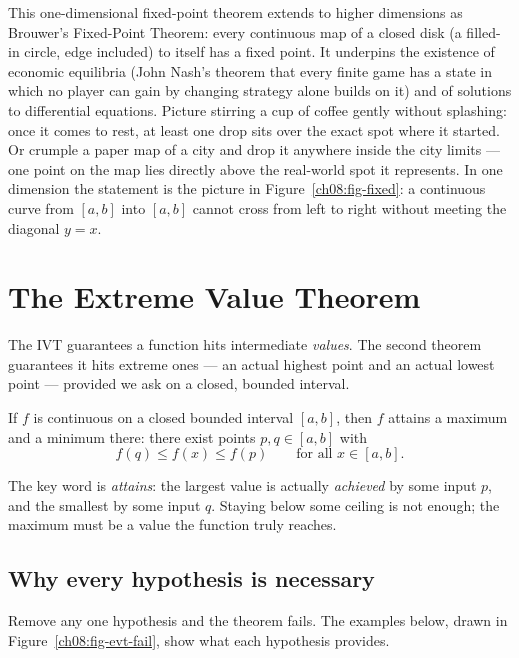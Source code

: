 \begin{connectionbox}
This one-dimensional fixed-point theorem extends to higher dimensions as
Brouwer's Fixed-Point Theorem: every continuous map of a closed disk (a filled-in circle,
edge included) to itself has a fixed point. It underpins the existence of economic
equilibria (John Nash's theorem that every finite game has a state in which no player can
gain by changing strategy alone builds on it) and of solutions to differential equations.
Picture stirring a cup of coffee gently without splashing: once it comes to rest, at least one
drop sits over the exact spot where it started. Or crumple a paper map of a city and drop it
anywhere inside the city limits --- one point on the map lies directly above the real-world spot it represents. In one dimension
the statement is the picture in Figure~\ref{ch08:fig-fixed}: a continuous curve from $[a,b]$ into $[a,b]$ cannot cross from left to right without meeting the diagonal $y=x$.
\end{connectionbox}

\section{The Extreme Value Theorem}
\label{ch08:evt}

The IVT guarantees a function hits intermediate \emph{values}. The second theorem
guarantees it hits extreme ones --- an actual highest point and an actual lowest point ---
provided we ask on a closed, bounded interval.

\begin{theorem}
\label{ch08:thm-evt}
If $f$ is continuous on a closed bounded interval $[a,b]$, then $f$ attains a maximum and a
minimum there: there exist points $p,q\in[a,b]$ with
\[
  f(q)\le f(x)\le f(p)\qquad\text{for all } x\in[a,b].
\]
\end{theorem}

The key word is \emph{attains}: the largest value is actually \emph{achieved} by some
input $p$, and the smallest by some input $q$. Staying below some ceiling is not enough;
the maximum must be a value the function truly reaches.

\subsection{Why every hypothesis is necessary}

Remove any one hypothesis and the theorem fails. The examples below, drawn in
Figure~\ref{ch08:fig-evt-fail}, show what each hypothesis provides.

